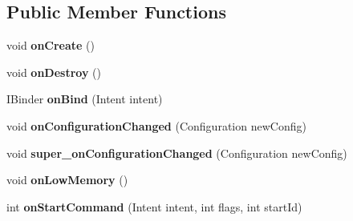 \subsection*{Public Member Functions}
\begin{DoxyCompactItemize}
\item 
\mbox{\label{classorg_1_1qtproject_1_1qt5_1_1android_1_1bindings_1_1_qt_service_a5df68f99165405f05ae629635196d79f}} 
void {\bfseries on\+Create} ()
\item 
\mbox{\label{classorg_1_1qtproject_1_1qt5_1_1android_1_1bindings_1_1_qt_service_a444550ad81daf93a1c16aa1be8d8106f}} 
void {\bfseries on\+Destroy} ()
\item 
\mbox{\label{classorg_1_1qtproject_1_1qt5_1_1android_1_1bindings_1_1_qt_service_a6be290e27bae5ffaac95b9e927b0ab9e}} 
I\+Binder {\bfseries on\+Bind} (Intent intent)
\item 
\mbox{\label{classorg_1_1qtproject_1_1qt5_1_1android_1_1bindings_1_1_qt_service_ac5d8739a6b54470c5703eba4163f9916}} 
void {\bfseries on\+Configuration\+Changed} (Configuration new\+Config)
\item 
\mbox{\label{classorg_1_1qtproject_1_1qt5_1_1android_1_1bindings_1_1_qt_service_af11056c9d4bf393bfd46ce0b28d4f9f5}} 
void {\bfseries super\+\_\+on\+Configuration\+Changed} (Configuration new\+Config)
\item 
\mbox{\label{classorg_1_1qtproject_1_1qt5_1_1android_1_1bindings_1_1_qt_service_acace90bf1d22799cca7058a8efd6da06}} 
void {\bfseries on\+Low\+Memory} ()
\item 
\mbox{\label{classorg_1_1qtproject_1_1qt5_1_1android_1_1bindings_1_1_qt_service_a89572663a2dffa68694c80ddf72fe601}} 
int {\bfseries on\+Start\+Command} (Intent intent, int flags, int start\+Id)
\item 

\end{DoxyCompactItemize}
